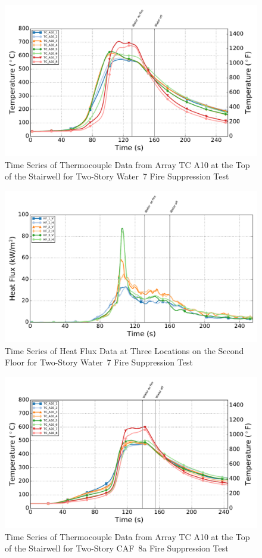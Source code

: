 \documentclass[12pt,oneside]{book}
\begin{document}
\begin{figure}[!ht]
	\includegraphics[width=.85\columnwidth]{../Figures/Script_Figures/Test_39_West_061315_TC_A10}
	\caption{Time Series of Thermocouple Data from Array TC A10 at the Top of the Stairwell for Two-Story Water~7 Fire Suppression Test}
	\label{fig:app_water7_tca10}
\end{figure}

\begin{figure}[!ht]
	\includegraphics[width=.85\columnwidth]{../Figures/Script_Figures/Test_39_West_061315_Heat_Flux}
	\caption{Time Series of Heat Flux Data at Three Locations on the Second Floor for Two-Story Water~7 Fire Suppression Test}
	\label{fig:app_water7_hf}
\end{figure}

\begin{figure}[!ht]
	\includegraphics[width=.85\columnwidth]{../Figures/Script_Figures/Test_40a_West_061415_TC_A10}
	\caption{Time Series of Thermocouple Data from Array TC A10 at the Top of the Stairwell for Two-Story CAF~8a Fire Suppression Test}
	\label{fig:app_caf8a_tca10}
\end{figure}
\end{document}
